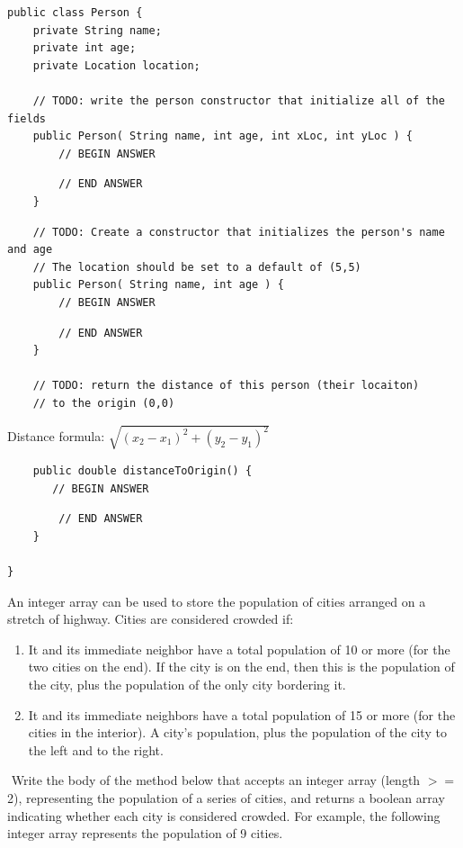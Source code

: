 \documentclass[11pt,answers]{exam}
\begin{document}
\begin{questions}
\begin{verbatim}
public class Person {
    private String name;
    private int age; 
    private Location location;

    // TODO: write the person constructor that initialize all of the fields
    public Person( String name, int age, int xLoc, int yLoc ) {
        // BEGIN ANSWER
\end{verbatim}
\begin{solution}[2in]
	
\end{solution}
\begin{verbatim}
        // END ANSWER
    }
\end{verbatim}
\newpage

\begin{verbatim}
	// TODO: Create a constructor that initializes the person's name and age
	// The location should be set to a default of (5,5)
    public Person( String name, int age ) {
        // BEGIN ANSWER
\end{verbatim}
\begin{solution}[2in]	
\end{solution}

\begin{verbatim}
        // END ANSWER
    }

    // TODO: return the distance of this person (their locaiton)
    // to the origin (0,0)
\end{verbatim}
\hspace{.4in}Distance formula: $\sqrt{ (x_2 - x_1)^2 + (y_2 - y_1)^2 }$
\begin{verbatim}
    public double distanceToOrigin() {
       // BEGIN ANSWER
\end{verbatim}
\begin{solution}[3in]
\end{solution}

\begin{verbatim}
        // END ANSWER
    }

}
\end{verbatim}

\newpage
\question[14] An integer array can be used to store the population of cities arranged on a stretch of highway. Cities are considered crowded if: 
\begin{enumerate}
	\item It and its immediate neighbor have a total population of 10 or more (for the two cities on the end).  If the city is on the end, then this is the population of the city, plus the population of the only city bordering it.
	\item It and its immediate neighbors have a total population of 15 or more (for the cities in the interior).   A city's population, plus the population of the city to the left and to the right.
\end{enumerate}
\par Write the body of the method below that accepts an integer array (length $>=$ 2), representing the population of a series of cities, and returns a boolean array indicating whether each city is considered crowded. For example, the following integer array represents the population of 9 cities. 


\end{questions}
\end{document}

